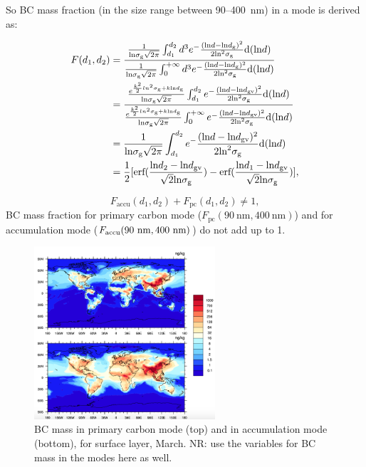 \documentclass[11pt]{article}
\newcommand{\nrtodo}[1]{{\color{blue} NR: #1}}
\begin{document}
\noindent So BC mass fraction (in the size range between 90--400~nm)
in a mode is derived as:

\begin{align*}
F(d_{1}, d_{2}) &= \frac{\frac{1}{\text{ln}\sigma_{\text{g}}\sqrt{2\pi}}\int_{d_{1}}^{d_{2}}d^3e^-\frac{(\text{ln}d - \text{ln}d_{\rm g})^2}{2\text{ln}^2\sigma_{\text{g}}}\text{d}(\text{ln}d)}
{\frac{1}{\text{ln}\sigma_{\text{g}}\sqrt{2\pi}}\int_{0}^{+\infty}d^3e^-\frac{(\text{ln}d - \text{ln}d_{\rm g})^2}{2\text{ln}^2\sigma_{\text{g}}}\text{d}(\text{ln}d)}  \\
&=\frac{\frac{e^{\frac{k^2}{2}ln^2\sigma_{\rm g}+k\text{ln}d_{\rm g}}}{\text{ln}\sigma_{\text{g}}\sqrt{2\pi}}\int_{d_{1}}^{d_{2}}e^-\frac{(\text{ln}d - \text{ln}d_{\text{gv}})^2}{2\text{ln}^2\sigma_{\text{g}}}\text{d}(\text{ln}d)}{\frac{e^{\frac{k^2}{2}ln^2\sigma_{\rm g}+k\text{ln}d_{\rm g}}}{\text{ln}\sigma_{\text{g}}\sqrt{2\pi}}\int_{0}^{+\infty}e^-\frac{(\text{ln}d - \text{ln}d_{\text{gv}})^2}{2\text{ln}^2\sigma_{\text{g}}}\text{d}(\text{ln}d)}\\
&=\frac{1}{\text{ln}\sigma_{\text{g}}\sqrt{2\pi}}\int_{d_{1}}^{d_{2}}e^-\frac{(\text{ln}d - \text{ln}d_{\text{gv}})^2}{2\text{ln}^2\sigma_{\text{g}}}\text{d}(\text{ln}d) \\
&=\frac{1}{2}[\text{erf}(\frac{\text{ln}d_{2} - \text{ln}d_{\text{gv}}}{\sqrt{2}\text{ln}\sigma_{\rm g}})-\text{erf}(\frac{\text{ln}d_{1} - \text{ln}d_{\text{gv}}}{\sqrt{2}\text{ln}\sigma_{\rm g}})],
\end{align*}

\[F_{\text{accu}}(d_{1}, d_{2}) + F_{\text{pc}}(d_{1}, d_{2}) \neq 1,\]
BC mass fraction for primary carbon mode ($F_{\text{pc}}(90~\text{nm}, 400~\text{nm})$) and for accumulation mode ($F_{\text{accu}}(90~\rm nm, 400~\rm nm)$) do not add up to 1.

\bigskip
\bigskip
\bigskip
\begin{figure}[!h] 
	\begin{center}
		\includegraphics[width = 0.6\textwidth]{Rplot01}
		\caption[]{\label{fig_P1}BC mass in primary carbon mode (top) and in accumulation mode (bottom), for surface layer, March. \nrtodo{use the variables for BC mass in the modes here as well.}}
	\end{center}
\end{figure}
\end{document}
